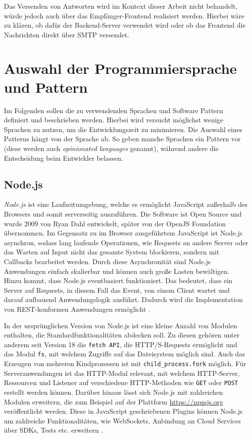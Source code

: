 \noindent Das Versenden von Antworten wird im Kontext dieser Arbeit nicht behandelt, würde jedoch auch über das Empfänger-Frontend realisiert werden. Hierbei wäre zu klären, ob dafür der Backend-Server verwendet wird oder ob das Frontend die Nachrichten direkt über SMTP versendet.


\section{Auswahl der Programmiersprache und Pattern}
\label{Auswahl_der_Technologie_und_Designpattern}

Im Folgenden sollen die zu verwendenden Sprachen und Software Pattern definiert und beschrieben werden. Hierbei wird versucht möglichst wenige Sprachen zu nutzen, um die Entwicklungszeit zu minimieren. Die Auswahl eines Patterns hängt von der Sprache ab. So geben manche Sprachen ein Pattern vor (diese werden auch \textit{opinionated languages} genannt), während andere die Entscheidung beim Entwickler belassen.

\subsection{Node.js}
\label{Node.js}

\textit{Node.js} ist eine Laufzeitumgebung, welche es ermöglicht JavaScript außerhalb des Browsers und somit serverseitig auszuführen. Die Software ist Open Source und wurde 2009 von Ryan Dahl entwickelt, später von der OpenJS Foundation übernommen. Im Gegensatz zu im Browser ausgeführtem JavaScript ist Node.js asynchron, sodass lang laufende Operationen, wie Requests an andere Server oder das Warten auf Input nicht das gesamte System blockieren, sondern mit Callbacks bearbeitet werden. Durch diese Asynchronität sind Node.js Anwendungen einfach skalierbar und können auch große Lasten bewältigen. Hinzu kommt, dass Node.js eventbasiert funktioniert. Das bedeutet, dass ein Server auf Requests, in diesem Fall das Event, von einem Client wartet und darauf aufbauend Anwendungslogik ausführt. Dadurch wird die Implementation von REST-konformen Anwendungen ermöglicht \citep{OpenJSFoundation2022}.

\noindent In der ursprünglichen Version von Node.js ist eine kleine Anzahl von Modulen enthalten, die Standardfunktionalitäten abdecken soll. Zu diesen gehören unter anderem seit Version 18 die \texttt{fetch API}, die HTTP/S-Requests ermöglicht und das Modul \texttt{fs}, mit welchem Zugriffe auf das Dateisystem möglich sind. Auch das Erzeugen von mehreren Kindprozessen ist mit \texttt{child\_process.fork} möglich. Für Serveranwendungen ist das HTTP-Modul relevant, mit welchem HTTP-Server, Ressourcen und Listener auf verschiedene HTTP-Methoden wie \texttt{GET} oder \texttt{POST} erstellt werden können. Darüber hinaus lässt sich Node.js mit zahlreichen Modulen erweitern, die zum Beispiel auf der Plattform \url{https://npmjs.org} veröffentlicht werden. Diese in JavaScript geschriebenen Plugins können Node.js um zahlreiche Funktionalitäten, wie WebSockets, Anbindung an Cloud Services über SDKs, Tests etc. erweitern \citep{OpenJSFoundation2022a}.

